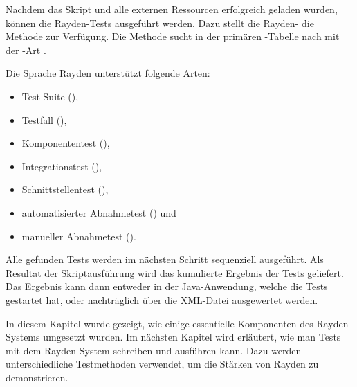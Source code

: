 \SuperPar
Nachdem das Skript und alle externen Ressourcen erfolgreich geladen wurden, können die Rayden-Tests ausgeführt werden. Dazu stellt die Rayden- die Methode  zur Verfügung. Die Methode sucht in der primären -Tabelle nach  mit der -Art . 

\SuperPar
Die Sprache Rayden unterstützt folgende Arten:

\begin{itemize}
\item Test-Suite (),
\item Testfall (),
\item Komponententest (),
\item Integrationstest (),
\item Schnittstellentest (),
\item automatisierter Abnahmetest () und
\item manueller Abnahmetest ().
\end{itemize}

\SuperPar
Alle gefunden Tests werden im nächsten Schritt sequenziell ausgeführt. Als Resultat der Skriptausführung wird das kumulierte Ergebnis der Tests geliefert. Das Ergebnis kann dann entweder in der Java-Anwendung, welche die Tests gestartet hat, oder nachträglich über die XML-Datei ausgewertet werden.

\SuperPar
In diesem Kapitel wurde gezeigt, wie einige essentielle Komponenten des Rayden-Systems umgesetzt wurden. Im nächsten Kapitel wird erläutert, wie man Tests mit dem Rayden-System schreiben und ausführen kann. Dazu werden unterschiedliche Testmethoden verwendet, um die Stärken von Rayden zu demonstrieren.
